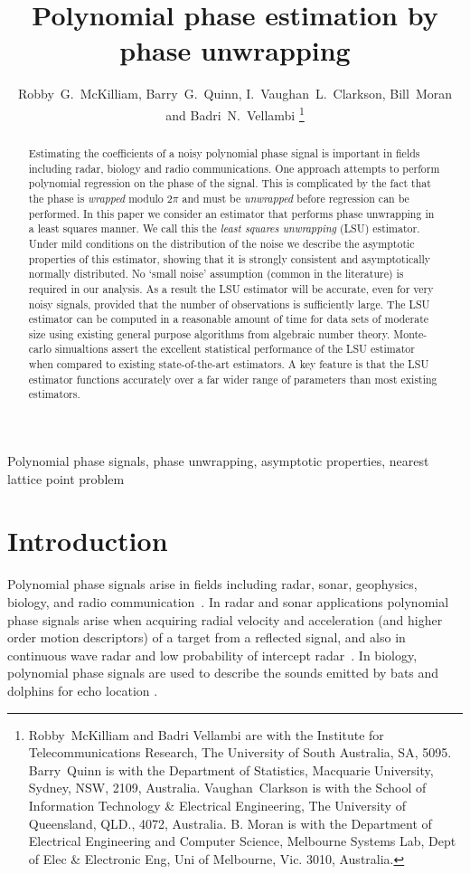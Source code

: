 \documentclass[journal]{IEEEtran}
\title{Polynomial phase estimation by phase unwrapping}
\author{Robby~G.~McKilliam, Barry~G.~Quinn, I.~Vaughan~L.~Clarkson, Bill~Moran and Badri~N.~Vellambi%
    \thanks{%
Robby~McKilliam and Badri Vellambi are with the Institute for Telecommunications Research, The University of South Australia, SA, 5095.  Barry~Quinn is with the Department of Statistics, Macquarie University, Sydney, NSW, 2109, Australia.   Vaughan~Clarkson is with the School of Information Technology \& Electrical Engineering, The University of Queensland, QLD., 4072, Australia.  B. Moran is with the Department of Electrical Engineering and Computer
Science, Melbourne Systems Lab, Dept of Elec \& Electronic Eng, Uni of Melbourne, Vic. 3010, Australia.}}
\begin{document}
 
\maketitle

\begin{abstract}
Estimating the coefficients of a noisy polynomial phase signal is important in fields including radar, biology and radio communications. One approach attempts to perform polynomial regression on the phase of the signal.  This is complicated by the fact that the phase is \emph{wrapped} modulo $2\pi$ and must be \emph{unwrapped} before regression can be performed.  In this paper we consider an estimator that performs phase unwrapping in a least squares manner.  We call this the \emph{least squares unwrapping} (LSU) estimator.  Under mild conditions on the distribution of the noise we describe the asymptotic properties of this estimator, showing that it is strongly consistent and asymptotically normally distributed.  No `small noise' assumption (common in the literature) is required in our analysis.  As a result the LSU estimator will be accurate, even for very noisy signals, provided that the number of observations is sufficiently large.  The LSU estimator can be computed in a reasonable amount of time for data sets of moderate size using existing general purpose algorithms from algebraic number theory.  Monte-carlo simualtions assert the excellent statistical performance of the LSU estimator when compared to existing state-of-the-art estimators.  A key feature is that the LSU estimator functions accurately over a far wider range of parameters than most existing estimators.
\end{abstract}

\begin{keywords}
Polynomial phase signals, phase unwrapping, asymptotic properties, nearest lattice point problem
\end{keywords}
 
%

\section{Introduction} \label{intro}

Polynomial phase signals arise in fields including radar, sonar, geophysics, biology, and radio communication~\cite{Hlawatsch_lin_quad_time_freq_spmag_1992,Ridleyspeechpolyphase1989, Suga_1975_bats_echolocation, Moss_2005echolocation,Angeby_estimating_2000}. In radar and sonar applications polynomial phase signals arise when acquiring radial velocity and acceleration (and higher order motion descriptors) of a target from a reflected signal, and also in continuous wave radar and low probability of intercept radar~\cite{Levanon_Radar_signals_2004}.  In biology, polynomial phase signals are used to describe the sounds emitted by bats and dolphins for echo location \citep{Suga_1975_bats_echolocation, Moss_2005echolocation}.  
\end{document}
